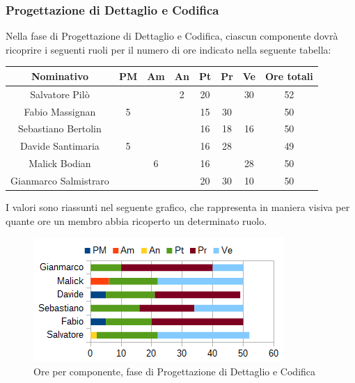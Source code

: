 		\subsubsection{Progettazione di Dettaglio e Codifica}
		Nella fase di Progettazione di Dettaglio e Codifica, ciascun componente dovrà ricoprire i seguenti ruoli per il numero di ore indicato nella seguente tabella: \\
		\begin{table}[H]
		\centering
		\begin{tabular}{|c|c|c|c|c|c|c|c|}
			\hline
			\textbf{Nominativo}		& \textbf{PM}	& \textbf{Am}	& \textbf{An}	& \textbf{Pt}	& \textbf{Pr}	& \textbf{Ve}	& \textbf{Ore totali}     \\
			\hline
			Salvatore Pilò			& 		& 		& 2		& 20	&		& 30	& 52 \\
			Fabio Massignan			& 5		& 		&		& 15	& 30	& 		& 50 \\
			Sebastiano Bertolin		&		& 		& 		& 16	& 18	& 16	& 50 \\
			Davide Santimaria		& 5		& 		& 		& 16	& 28	&		& 49 \\
			Malick Bodian			& 		& 6		&		& 16	&		& 28	& 50 \\
			Gianmarco Salmistraro	&		& 		& 		& 20	& 30	& 10	& 50 \\
			\hline
		\end{tabular}
		\end{table}
		I valori sono riassunti nel seguente grafico, che rappresenta in maniera visiva per quante ore un membro abbia ricoperto un determinato ruolo. \\
		\begin{figure}[H]
			\centering
			\includegraphics[scale=1]{immagini/grafici/progettazione_dettaglio_codifica-barra.png}
			\caption{Ore per componente, fase di Progettazione di Dettaglio e Codifica}
		\end{figure}
